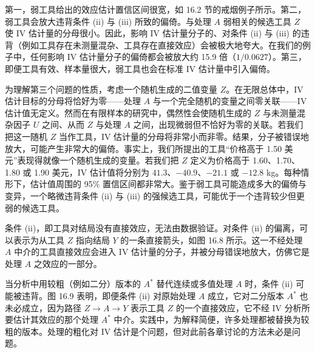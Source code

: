 第一，弱工具给出的效应估计置信区间很宽，如 16.2 节的戒烟例子所示。第二，弱工具会放大违背条件 (ii) 与 (iii) 所致的偏倚。与处理 $A$ 弱相关的候选工具 $Z$ 使 IV 估计量的分母很小。因此，影响 IV 估计量分子的、对条件 (ii) 与 (iii) 的违背（例如工具存在未测量混杂、工具存在直接效应）会被极大地夸大。在我们的例子中，任何影响 IV 估计量分子的偏倚都会被放大约 15.9 倍（$1/0.0627$）。第三，即便工具有效、样本量很大，弱工具也会在标准 IV 估计量中引入偏倚。

为理解第三个问题的性质，考虑一个随机生成的二值变量 $Z$。在无限总体中，IV 估计目标的分母将恰好为零——处理 $A$ 与一个完全随机的变量之间零关联——IV 估计值无定义。然而在有限样本的研究中，偶然性会使随机生成的 $Z$ 与未测量混杂因子 $U$ 之间、从而 $Z$ 与处理 $A$ 之间，出现微弱但不恰好为零的关联。若我们把这一随机 $Z$ 当作工具，IV 估计量的分母将非常小而非零。结果，分子被错误地放大，可能产生非常大的偏倚。事实上，我们所提出的工具“价格高于 1.50 美元”表现得就像一个随机生成的变量。若我们把 $Z$ 定义为价格高于 1.60、1.70、1.80 或 1.90 美元，IV 估计值将分别为 $41.3$、$-40.9$、$-21.1$ 或 $-12.8$ kg。每种情形下，估计值周围的 95\% 置信区间都非常大。鉴于弱工具可能造成多大的偏倚与变异，一个略微违背条件 (ii) 与 (iii) 的强候选工具，可能优于一个违背较少但更弱的候选工具。

条件 (ii)，即工具对结局没有直接效应，无法由数据验证。对条件 (ii) 的偏离，可以表示为从工具 $Z$ 指向结局 $Y$ 的一条直接箭头，如图 16.8 所示。这一不经处理 $A$ 中介的工具直接效应会进入 IV 估计量的分子，并被分母错误地放大，仿佛它是处理 $A$ 之效应的一部分。

\begin{figure}[!ht]
\centering
{}
\caption{}
\label{fig:16.8}
\end{figure}

当分析中用较粗（例如二分）版本的 $A^{*}$ 替代连续或多值处理 $A$ 时，条件 (ii) 可能被违背。图 16.9 表明，即便条件 (ii) 对原始处理 $A$ 成立，它对二分版本 $A^{*}$ 也未必成立，因为路径 $Z\rightarrow A\rightarrow Y$ 表示工具 $Z$ 的一个直接效应，它不经 IV 分析所要估计其效应的那个处理 $A^{*}$ 中介。实践中，为解释简便，许多处理都被替换为较粗的版本。处理的粗化对 IV 估计是个问题，但对此前各章讨论的方法未必是问题。

